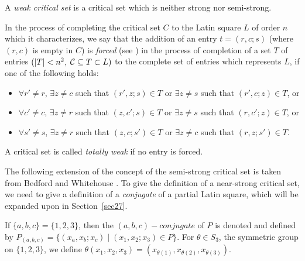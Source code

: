 \documentclass[12pt]{report}
\begin{document}
A {\it weak critical set} is a critical set which is neither strong nor semi-strong.

In the process of completing the critical set $C$ to the 
Latin square $L$ of order $n$ which it characterizes, we say that the addition
of an entry $t=(r,c;s)$ (where $(r,c)$ is empty in $C$) is {\em forced} (see \cite {MR99j:05036})
in the process of completion of a set $T$ of entries
$(|T|<n^2,\;{\cal C}\subseteq T\subset L)$ to the complete set of
entries which represents $L$, if one of the following holds:
\begin{itemize}
\item [(i)] $\forall r' \neq r$, $\exists z \neq c$ such that 
$(r',z;s)\in T$ or $\exists z \neq s$ such that 
$(r',c;z)\in T$, or 
\item [(ii)] $\forall c' \neq c$, $\exists z \neq r$ such that 
$(z,c';s)\in T$ or $\exists z \neq s$ such that 
$(r,c';z)\in T$, or
\item [(iii)] $\forall s' \neq s$, $\exists z \neq r$ such that 
$(z,c;s')\in T$ or $\exists z \neq c$ such that 
$(r,z;s')\in T$.
\end{itemize}
A critical set is called {\em totally weak} if no entry is forced.

The following extension of the concept of the semi-strong critical set is
taken from Bedford and Whitehouse \cite{bandw}.  To give the definition
of a near-strong critical set, we need to give a definition of a {\it
conjugate} of a partial Latin square, which will be expanded upon
in Section~\ref{sec27}.

If $\{ a,b,c \} = \{ 1,2,3 \}$, then the $(a,b,c)-conjugate$ of $P$
is denoted and defined by $P_{(a,b,c)} = \{ (x_a, x_b; x_c) \mid (x_1, x_2; x_3) 
\in P \}$.  For $\theta \in S_3$, the symmetric group on $\{1,2,3\}$,
we define $\theta(x_1,x_2,x_3)=(x_{\theta(1)},x_{\theta(2)},x_{\theta(3)})$.
\end{document}
